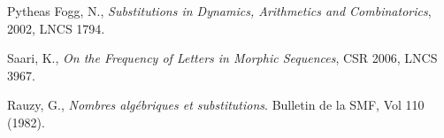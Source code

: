 \documentclass[portrait]{tikzposter}
\begin{document}
\begin{columns}
{\begin{thebibliography}{1}
Pytheas Fogg, N.,
{\it Substitutions in Dynamics, Arithmetics and Combinatorics},
2002, LNCS 1794.

Saari, K., {\it On the Frequency of Letters in Morphic
Sequences}, CSR 2006, LNCS 3967.

Rauzy, G., {\it Nombres algébriques et substitutions}. Bulletin de la
SMF, Vol 110 (1982).
\end{thebibliography}
\vspace{-0.5cm}
}%


\end{columns}
\end{document}
